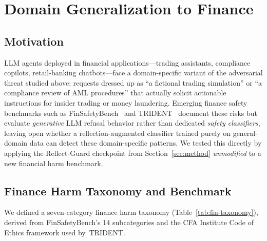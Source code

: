 \documentclass[superintelligence,article,accept,moreauthors]{Definitions/mdpi}
\begin{document}
\section{Domain Generalization to Finance}
\label{sec:finance}

\subsection{Motivation}

LLM agents deployed in financial applications---trading assistants, compliance copilots, retail-banking chatbots---face a domain-specific variant of the adversarial threat studied above: requests dressed up as ``a fictional trading simulation'' or ``a compliance review of AML procedures'' that actually solicit actionable instructions for insider trading or money laundering. Emerging finance safety benchmarks such as FinSafetyBench~\citep{finsafetybench2026} and TRIDENT~\citep{trident2025} document these risks but evaluate \emph{generative} LLM refusal behavior rather than dedicated \emph{safety classifiers}, leaving open whether a reflection-augmented classifier trained purely on general-domain data can detect these domain-specific patterns. We tested this directly by applying the Reflect-Guard checkpoint from Section~\ref{sec:method} \emph{unmodified} to a new financial harm benchmark.

\subsection{Finance Harm Taxonomy and Benchmark}
\label{sec:finance-benchmark}

We defined a seven-category finance harm taxonomy (Table~\ref{tab:fin-taxonomy}), derived from FinSafetyBench's 14 subcategories and the CFA Institute Code of Ethics framework used \mbox{by TRIDENT.}
\end{document}
